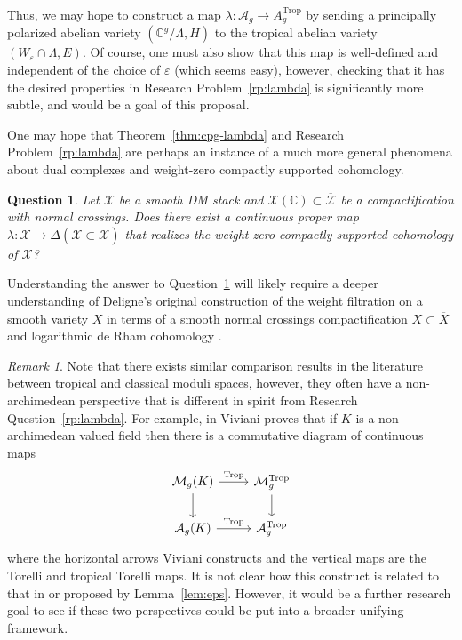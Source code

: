 \documentclass[11pt,reqno]{amsart}
\newtheorem{question}[lemma]{Question}
\theoremstyle{remark}
\newtheorem{remark}[lemma]{Remark}
\newcommand{\CC}{\mathbb{C}}
\newcommand{\cA}{\mathcal{A}}
\newcommand{\cM}{\mathcal{M}}
\newcommand{\cX}{\mathcal{X}}
\DeclareMathOperator{\Trop}{Trop}
\DeclareMathOperator{\trop}{Trop}
\begin{document}
Thus, we may hope to construct a map $\lambda:\cA_{g}\to A_{g}^{\trop}$ by sending a principally polarized abelian variety $(\CC^{g}/\Lambda,H)$ to the tropical abelian variety $(W_{\varepsilon}\cap \Lambda, E)$. Of course, one must also show that this map is well-defined and independent of the choice of $\varepsilon$ (which seems easy), however, checking that it has the desired properties in Research Problem~\ref{rp:lambda} is significantly more subtle, and would be a goal of this proposal. 

One may hope that Theorem~\ref{thm:cpg-lambda} and Research Problem~\ref{rp:lambda} are perhaps an instance of a much more general phenomena about dual complexes and weight-zero compactly supported cohomology.

\begin{question}\label{ques:hodge}
Let $\cX$ be a smooth DM stack and $\cX(\CC)\subset \overline{\cX}$ be a compactification with normal crossings. Does there exist a continuous proper map $\lambda:\cX\to \Delta(\cX \subset \overline{\cX})$ that realizes the weight-zero compactly supported cohomology of $\cX$?
\end{question}

Understanding the answer to Question~\ref{ques:hodge} will likely require a deeper understanding of Deligne's original construction of the weight filtration on a smooth variety $X$ in terms of a smooth normal crossings compactification $X\subset \overline{X}$ and logarithmic de Rham cohomology \cite{Deligne71, Deligne74}.

\begin{remark}
Note that there exists similar comparison results in the literature between tropical and classical moduli spaces, however, they often have a non-archimedean perspective that is different in spirit from Research Question~\ref{rp:lambda}. For example, in \cite{viviani13} Viviani proves that if $K$ is a non-archimedean valued field then there is a commutative diagram of continuous maps
\[
\begin{tikzcd}
\cM_{g}(K) \arrow[r, "\trop"] \arrow[d] & \cM_{g}^{\Trop} \arrow[d]\\
\cA_{g}(K) \arrow[r, "\trop"] & \cA_{g}^{\Trop} 
\end{tikzcd}
\]
where the horizontal arrows Viviani constructs and the vertical maps are the Torelli and tropical Torelli maps. It is not clear how this construct is related to that in \cite[Section 7]{CGP21} or proposed by Lemma~\ref{lem:eps}. However, it would be a further research goal to see if these two perspectives could be put into a broader unifying framework. 
\end{remark}
\end{document}
